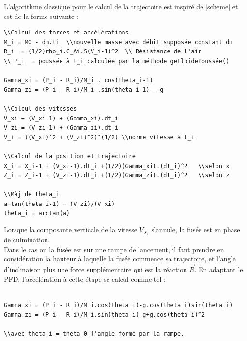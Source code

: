 \documentclass[a4paper]{article}
\begin{document}
L'algorithme classique pour le calcul de la trajectoire est inspiré de \ref{scheme} et est de la forme suivante :
\begin{verbatim}
\\Calcul des forces et accélérations 
M_i = M0 - dm.ti  \\nouvelle masse avec débit supposée constant dm
R_i  = (1/2)rho_i.C_Ai.S(V_i-1)^2  \\ Résistance de l'air
\\ P_i  = poussée à t_i calculée par la méthode getloidePoussée()

Gamma_xi = (P_i - R_i)/M_i . cos(theta_i-1)
Gamma_zi = (P_i - R_i)/M_i .sin(theta_i-1) - g

\\Calcul des vitesses
V_xi = (V_xi-1) + (Gamma_xi).dt_i	
V_zi = (V_zi-1) + (Gamma_zi).dt_i
V_i = ((V_xi)^2 + (V_zi)^2)^(1/2) \\norme vitesse à t_i

\\Calcul de la position et trajectoire
X_i = X_i-1 + (V_xi-1).dt_i +(1/2)(Gamma_xi).(dt_i)^2	\\selon x
Z_i = Z_i-1 + (V_zi-1).dt_i +(1/2)(Gamma_zi).(dt_i)^2	\\selon z

\\Màj de theta_i
a=tan(theta_i-1) = (V_zi)/(V_xi)
theta_i = arctan(a)

\end{verbatim}





Lorsque la composante verticale de la vitesse $V_{X_{i}}$ s'annule, la fusée est en phase de culmination.\\

Dans le cas ou la fusée est sur une rampe de lancement, il faut prendre en considération la hauteur à laquelle la fusée commence sa trajectoire, et l'angle d'inclinaison plus une force supplémentaire qui est la réaction {$\vec R$}. En adaptant le PFD, l'accélération à cette étape se calcul comme tel :
 
\begin{verbatim}

Gamma_xi = (P_i - R_i)/M_i.cos(theta_i)-g.cos(theta_i)sin(theta_i)
Gamma_zi = (P_i - R_i)/M_i.sin(theta_i)-g+g.cos(theta_i)^2	

\\avec theta_i = theta_0 l'angle formé par la rampe.

\end{verbatim}
\end{document}
